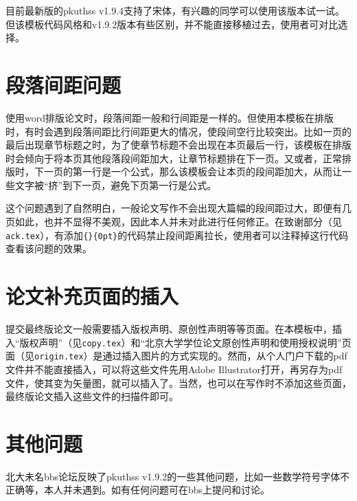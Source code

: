 目前最新版的pkuthss v1.9.4支持了宋体，有兴趣的同学可以使用该版本试一试。但该模板代码风格和v1.9.2版本有些区别，并不能直接移植过去，使用者可对比选择。

\section{段落间距问题}

使用word排版论文时，段落间距一般和行间距是一样的。但使用本模板在排版时，有时会遇到段落间距比行间距更大的情况，使段间空行比较突出。比如一页的最后出现章节标题之时，为了使章节标题不会出现在本页最后一行，该模板在排版时会倾向于将本页其他段落段间距加大，让章节标题排在下一页。又或者，正常排版时，下一页的第一行是一个公式，那么该模板会让本页的段间距加大，从而让一些文字被“挤”到下一页，避免下页第一行是公式。

这个问题遇到了自然明白，一般论文写作不会出现大篇幅的段间距过大，即便有几页如此，也并不显得不美观，因此本人并未对此进行任何修正。在致谢部分（见\texttt{ack.tex}），有添加\texttt{\string\setlength\{\string\parskip\}\{0pt\}}的代码禁止段间距离拉长，使用者可以注释掉这行代码查看该问题的效果。

\section{论文补充页面的插入}

提交最终版论文一般需要插入版权声明、原创性声明等等页面。在本模板中，插入“版权声明”（见\texttt{copy.tex}）和“北京大学学位论文原创性声明和使用授权说明”页面（见\texttt{origin.tex}）是通过插入图片的方式实现的。然而，从个人门户下载的pdf文件并不能直接插入，可以将这些文件先用Adobe Illustrator打开，再另存为pdf文件，使其变为矢量图，就可以插入了。当然，也可以在写作时不添加这些页面，最终版论文插入这些文件的扫描件即可。

\section{其他问题}

北大未名bbs论坛反映了pkuthss v1.9.2的一些其他问题，比如一些数学符号字体不正确等，本人并未遇到。如有任何问题可在bbs上提问和讨论。